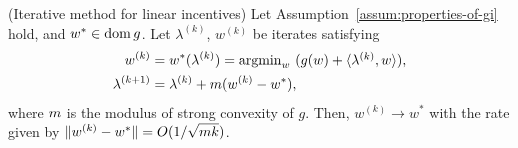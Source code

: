 \begin{theorem} (Iterative method for linear incentives)
\label{thm:iterative-method}
Let Assumption~\ref{assum:properties-of-gi} hold, and $w^* \in \operatorname{dom}{g}$.
Let $\lambda^{(k)}$, $w^{(k)}$ be iterates satisfying
\begin{subequations}
\label{eq:iterative-method-const-step}
\begin{align}
    w^{(k)} & = w^*(\lambda^{(k)}) = \textstyle{\operatorname*{argmin}}_w \ (g(w) + \langle \lambda^{(k)}, w\rangle), \label{subeq:iterative-method-const-step-gradient} \\
    \lambda^{(k+1)} & = \lambda^{(k)} + m (w^{(k)} - w^*), \label{subeq:iterative-method-const-step-flow}
\end{align}
\end{subequations}
where $m$ is the modulus of strong convexity of $g$.
Then, $w^{(k)} \rightarrow w^*$ %
with the rate given by $\lVert w^{(k)} - w^*\rVert = O(1/\sqrt{m k})$.
\end{theorem}

